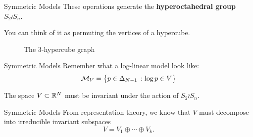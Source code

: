 \documentclass[xcolor=dvipsnames]{beamer}
\newcommand*{\ms}{\mathcal M}
\begin{document}
\begin{frame}{Symmetric Models}
    These operations generate the \textbf{hyperoctahedral group} $S_2 \wr S_n$.

    \lspace
    You can think of it as permuting the vertices of a hypercube.
    \begin{figure}[h]
        \centering


        \caption{The $3$-hypercube graph}
        \label{fig:hypercube}
    \end{figure}
\end{frame}

\begin{frame}{Symmetric Models}
    Remember what a log-linear model look like: 
    \[\ms_V = \cdel[\big]{ p \in \Delta_{N-1} \:: \log
    p  \in V}\]

    \lspace
    The space $V \subset \mathbb{R}^N$ must be invariant under the action of $S_2 \wr
    S_n$.
\end{frame}

\begin{frame}{Symmetric Models}
    From representation theory, we know that $V$ must decompose into irreducible
    invariant subspaces
    \[
        V = V_1 \oplus \cdots \oplus V_k.
    \]
\end{frame}
\end{document}

